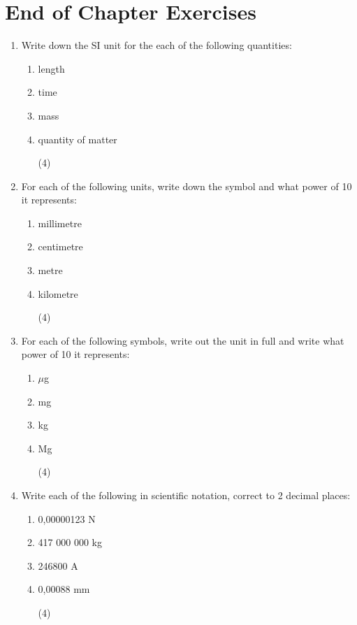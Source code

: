\section{End of Chapter Exercises}
\begin{enumerate}

\item{Write down the SI unit for the each of the following quantities:
\begin{enumerate}
\item{length}
\item{time}
\item{mass}
\item{quantity of matter}
\begin{flushright}
(4)
\end{flushright}
\end{enumerate}}

\item{For each of the following units, write down the symbol and what power of 10 it represents:
\begin{enumerate}
\item{millimetre}
\item{centimetre}
\item{metre}
\item{kilometre}
\begin{flushright}
(4)
\end{flushright}
\end{enumerate}}

\item{For each of the following symbols, write out the unit in full and write what power of 10 it represents:
\begin{enumerate}
\item{$\mu$g}
\item{mg}
\item{kg}
\item{Mg}
\begin{flushright}
(4)
\end{flushright}
\end{enumerate}}

\item{Write each of the following in scientific notation, correct to 2 decimal places:
\begin{enumerate}
\item{0,00000123 N}
\item{417 000 000 kg}
\item{246800 A}
\item{0,00088 mm}
\begin{flushright}
(4)
\end{flushright}
\end {enumerate}}


\end{enumerate}
